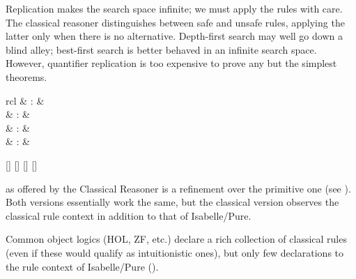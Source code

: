 \begin{isabellebody}
\begin{isamarkuptext}
  Replication makes the search space infinite; we must apply the rules
  with care.  The classical reasoner distinguishes between safe and
  unsafe rules, applying the latter only when there is no alternative.
  Depth-first search may well go down a blind alley; best-first search
  is better behaved in an infinite search space.  However, quantifier
  replication is too expensive to prove any but the simplest theorems.%
\end{isamarkuptext}%
\isamarkuptrue%
%
\isamarkuptrue%
%
\begin{isamarkuptext}%
\begin{matharray}{rcl}
    \hypertarget{method.rule}{\hyperlink{method.rule}{\mbox{}}} & : &  \\
    \hypertarget{method.contradiction}{\hyperlink{method.contradiction}{\mbox{}}} & : &  \\
    \hypertarget{method.intro}{\hyperlink{method.intro}{\mbox{}}} & : &  \\
    \hypertarget{method.elim}{\hyperlink{method.elim}{\mbox{}}} & : &  \\
  \end{matharray}

  \begin{railoutput}
\rail@bar
{}[]
[]
[]
\rail@endbar
\rail@bar
{}
[]
\rail@endbar
\rail@end
\end{railoutput}


  \begin{description}

  \item \hyperlink{method.rule}{\mbox{}} as offered by the Classical Reasoner is a
  refinement over the primitive one (see ).
  Both versions essentially work the same, but the classical version
  observes the classical rule context in addition to that of
  Isabelle/Pure.

  Common object logics (HOL, ZF, etc.) declare a rich collection of
  classical rules (even if these would qualify as intuitionistic
  ones), but only few declarations to the rule context of
  Isabelle/Pure ().


\end{description}
\end{isamarkuptext}
\end{isabellebody}
